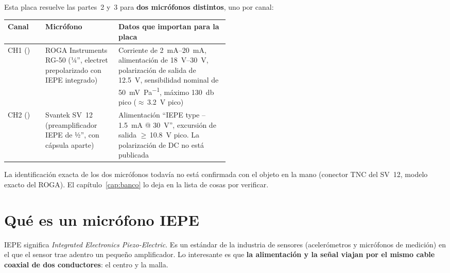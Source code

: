 Esta placa resuelve las partes~2 y~3 para \textbf{dos micrófonos distintos}, uno por canal:

\begin{center}
\begin{tabularx}{\linewidth}{@{}L{0.17\linewidth}L{0.33\linewidth}Y@{}}
\toprule
\textbf{Canal} & \textbf{Micrófono} & \textbf{Datos que importan para la placa}\\
\midrule
CH1 () & ROGA Instruments RG-50 (¼'', electret prepolarizado con IEPE integrado) & Corriente de \SIrange{2}{20}{\milli\ampere}, alimentación de \SIrange{18}{30}{\volt}, polarización de salida de \SI{12.5}{\volt}, sensibilidad nominal de \SI{50}{\milli\volt\per\pascal}, máximo \SI{130}{\decibel} pico ($\approx$\,\SI{3.2}{\volt} pico) \\
CH2 () & Svantek SV~12 (preamplificador IEPE de ½'', con cápsula aparte) & Alimentación ``IEPE type -- \SI{1.5}{\milli\ampere} @ \SI{30}{\volt}'', excursión de salida $\geq$\,\SI{10.8}{\volt} pico. La polarización de DC no está publicada \\
\bottomrule
\end{tabularx}
\end{center}

La identificación exacta de los dos micrófonos todavía no está confirmada con el objeto en la mano (conector TNC del SV~12, modelo exacto del ROGA). El capítulo~\ref{cap:banco} lo deja en la lista de cosas por verificar.

\section{Qué es un micrófono IEPE}\label{sec:c01-iepe}

IEPE significa \emph{Integrated Electronics Piezo-Electric}. Es un estándar de la industria de sensores (acelerómetros y micrófonos de medición) en el que el sensor trae adentro un pequeño amplificador. Lo interesante es que \textbf{la alimentación y la señal viajan por el mismo cable coaxial de dos conductores}: el centro y la malla.

